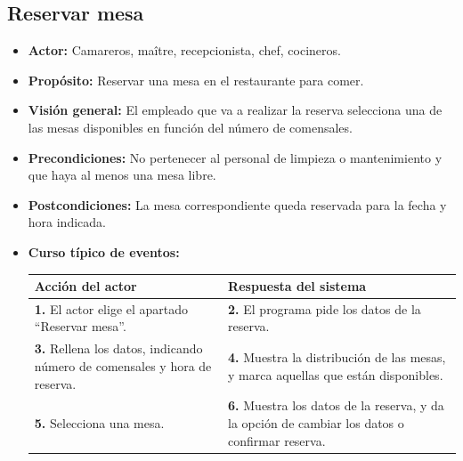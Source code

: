\documentclass[spanish,a4paper,11pt, twoside]{report}	%
\begin{document}
		\subsection{Reservar mesa} 
			\begin{itemize}
			\item \textbf{Actor:} Camareros, maître, recepcionista, chef, cocineros.
			\item \textbf{Propósito:} Reservar una mesa en el restaurante para comer.
			\item \textbf{Visión general:} El empleado que va a realizar la reserva
					selecciona una de las mesas disponibles en función del número de comensales.
			\item \textbf{Precondiciones:} No pertenecer al personal de limpieza o
					mantenimiento y que haya al menos una mesa libre.
			\item \textbf{Postcondiciones:} La mesa correspondiente queda reservada para la
					fecha y hora indicada.
			\item \textbf{Curso típico de eventos:} 	\\
				\begin{tabular}{|p{6cm}||p{6cm}|}
				\hline
				\textbf{Acción del actor} & \textbf{Respuesta del sistema} \\ \hline \hline
				  \textbf{1.} El actor elige el apartado ``Reservar mesa''. &
				  \textbf{2.} El programa pide los datos de la reserva.		\\ \hline
				  \textbf{3.} Rellena los datos, indicando número de comensales y hora de reserva. &
				  \textbf{4.} Muestra la distribución de las mesas, y marca aquellas que están disponibles.	\\ \hline
				  \textbf{5.} Selecciona una mesa. &
				  \textbf{6.} Muestra los datos de la reserva, y da la opción de cambiar los datos o confirmar reserva.	
				  	\\ \hline
			\end{tabular}
			\\
		\end {itemize}
		
\end{document}
